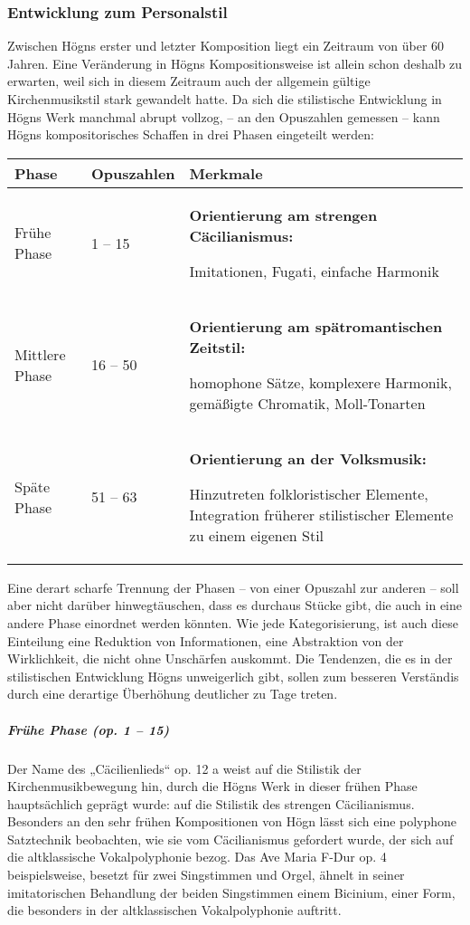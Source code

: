 \subsubsection{Entwicklung zum Personalstil}

\hypertarget{RefHeadingToc100333751}{}Zwischen Högns erster und letzter
Komposition liegt ein Zeitraum von über 60 Jahren. Eine Veränderung in
Högns Kompositionsweise ist allein schon deshalb zu erwarten, weil sich
in diesem Zeitraum auch der allgemein gültige Kirchenmusikstil stark
gewandelt hatte. Da sich die stilistische Entwicklung in Högns Werk
manchmal abrupt vollzog, – an den Opuszahlen gemessen – kann Högns
kompositorisches Schaffen in drei Phasen eingeteilt werden:

\begin{flushleft}
\tablefirsthead{}
\tablehead{}
\tabletail{}
\tablelasttail{}
\begin{supertabular}{|m{3.166cm}|m{2.763cm}|m{9.734cm}|}
\hline
{\bfseries Phase} &
{\bfseries Opuszahlen} &
{\bfseries Merkmale}\\\hline
Frühe Phase &
1 – 15 &
{\bfseries Orientierung am strengen Cäcilianismus: }

Imitationen, Fugati, einfache Harmonik\\\hline
Mittlere Phase &
16 – 50 &
\textbf{Orientierung am spätromantischen Zeitstil:}

homophone Sätze, komplexere Harmonik, gemäßigte Chromatik,
Moll-Tonarten\\\hline
Späte Phase &
51 – 63 &
\textbf{Orientierung an der Volksmusik:}

Hinzutreten folkloristischer Elemente, Integration früherer
stilistischer Elemente zu einem eigenen Stil \\\hline
\end{supertabular}
\end{flushleft}
Eine derart scharfe Trennung der Phasen – von einer Opuszahl zur anderen
– soll aber nicht darüber hinwegtäuschen, dass es durchaus Stücke gibt,
die auch in eine andere Phase einordnet werden könnten. Wie jede
Kategorisierung, ist auch diese Einteilung eine Reduktion von
Informationen, eine Abstraktion von der Wirklichkeit, die nicht ohne
Unschärfen auskommt. Die Tendenzen, die es in der stilistischen
Entwicklung Högns unweigerlich gibt, sollen zum besseren Verständis
durch eine derartige Überhöhung deutlicher zu Tage treten.

\subparagraph{Frühe Phase (op. 1 – 15)}
Der Name des „Cäcilienlieds“ op. 12 a weist auf die Stilistik der
Kirchenmusikbewegung hin, durch die Högns Werk in dieser frühen Phase
hauptsächlich geprägt wurde: auf die Stilistik des strengen
Cäcilianismus. Besonders an den sehr frühen Kompositionen von Högn
lässt sich eine polyphone Satztechnik beobachten, wie sie vom
Cäcilianismus gefordert wurde, der sich auf die altklassische
Vokalpolyphonie bezog. Das Ave Maria F-Dur op. 4 beispielsweise,
besetzt für zwei Singstimmen und Orgel, ähnelt in seiner imitatorischen
Behandlung der beiden Singstimmen einem Bicinium, einer Form, die
besonders in der altklassischen Vokalpolyphonie auftritt.

